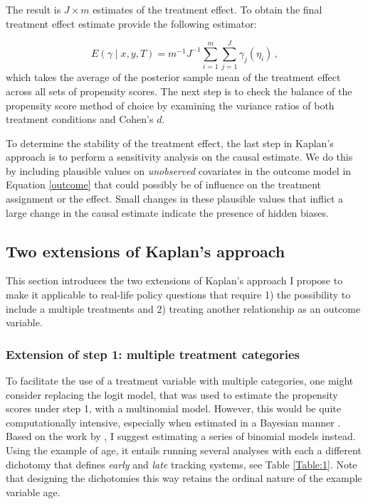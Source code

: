 \documentclass{article}
\begin{document}
\pagebreak
The result is $J \times m$ estimates of the treatment effect. To obtain the final treatment effect estimate \textcite{kaplan2012two} provide the following estimator:

\begin{equation} \label{gamma_est}
E(\gamma \mid x, y, T)=m^{-1} J^{-1} \sum_{i=1}^{m} \sum_{j=1}^{J} \gamma_{j}\left(\eta_{i}\right)\,,
\end{equation}
which takes the average of the posterior sample mean of the treatment effect across all sets of propensity scores. The next step is to check the balance of the propensity score method of choice by examining the variance ratios of both treatment conditions and Cohen’s $d$.

To determine the stability of the treatment effect, the last step in Kaplan's approach is to perform a sensitivity analysis on the causal estimate. We do this by including plausible values on \emph{unobserved} covariates in the outcome model in Equation \ref{outcome} that could possibly be of influence on the treatment assignment or the effect. Small changes in these plausible values that inflict a large change in the causal estimate indicate the presence of hidden biases.\newline

\subsection{Two extensions of Kaplan's approach}
This section introduces the two extensions of Kaplan's approach I propose to make it applicable to real-life policy questions that require 1) the possibility to include a multiple treatments and 2) treating another relationship as an outcome variable. 

\subsubsection{Extension of step 1: multiple treatment categories}
To facilitate the use of a treatment variable with multiple categories, one might consider replacing the logit model, that was used to estimate the propensity scores under step 1, with a multinomial model. However, this would be quite computationally intensive, especially when estimated in a Bayesian manner \parencite{caliendo2008some}. Based on the work by \textcite{lechner2001identification}, I suggest estimating a series of binomial models instead. Using the example of age, it entails running several analyses with each a different dichotomy that defines \emph{early} and \emph{late} tracking systems, see Table \ref{Table:1}. Note that designing the dichotomies this way retains the ordinal nature of the example variable age.
\end{document}
